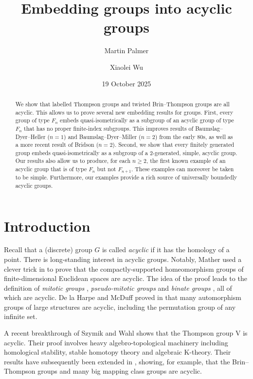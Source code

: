 \documentclass[10pt,a4paper]{amsart}
\title{Embedding groups into acyclic groups}
\author{Martin Palmer}
\author{Xiaolei Wu}
\date{19 October 2025}
\numberwithin{equation}{section}
\numberwithin{figure}{section}
\theoremstyle{definition}
\newcommand{\V}{\mathrm{V}}
\renewcommand{\geq}{\geqslant}
\begin{document}
\begin{abstract}
We show that labelled Thompson groups and twisted Brin--Thompson groups are all acyclic. This allows us to prove several new embedding results for groups. First, every group of type $F_n$ embeds quasi-isometrically as a subgroup of an acyclic group of type $F_n$ that has no proper finite-index subgroups. This improves results of Baumslag--Dyer--Heller ($n=1$) and Baumslag--Dyer--Miller ($n=2$) from the early 80s, as well as a more recent result of Bridson ($n=2$). Second, we show that every finitely generated group embeds quasi-isometrically as a subgroup of a $2$-generated, simple, acyclic group. Our results also allow us to produce, for each $n\geq 2$, the first known example of an acyclic group that is of type $F_n$ but not $F_{n+1}$. These examples can moreover be taken to be simple. Furthermore, our examples provide a rich source of universally boundedly acyclic groups.
\end{abstract}
\maketitle


\section*{Introduction}

Recall that a (discrete) group $G$ is called \emph{acyclic} if it has the homology of a point. There is long-standing interest in acyclic groups. Notably, Mather used a clever trick in \cite{Mather1971} to prove that the compactly-supported homeomorphism groups of finite-dimensional Euclidean spaces are acyclic. The idea of the proof leads to the definition of \emph{mitotic groups} \cite{BauDyHe80}, \emph{pseudo-mitotic groups} \cite{Varadarajan85} and \emph{binate groups} \cite{Berrick1989}, all of which are acyclic. De la Harpe and McDuff proved in \cite{dlHM83} that many automorphism groups of large structures are acyclic, including the permutation group of any infinite set.

A recent breakthrough of Szymik and Wahl \cite{SW19} shows that the Thompson group $\V$ is acyclic. Their proof involves heavy algebro-topological machinery including homological stability, stable homotopy theory and algebraic K-theory. Their results have subsequently been extended in \cite{Li2024, KLM+24, PalmerWu2024}, showing, for example, that the Brin--Thompson groups and many big mapping class groups are acyclic.
\end{document}
